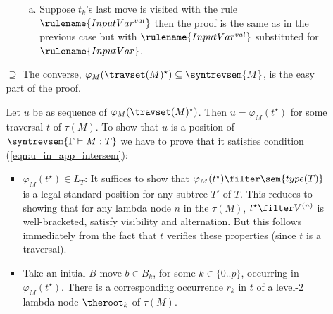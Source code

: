 \begin{itemize}[$\bullet$]
\begin{enumerate}
\begin{itemize}
\begin{enumerate}[(a)]
    \item Suppose $t_k$'s last move is visited with the rule $\rulename{InputVar^{val}}$ then the proof is the same as in the previous case but with $\rulename{InputVar^{val}}$ substituted for $\rulename{InputVar}$.
    \end{enumerate}

    \end{itemize}

\item[$\supseteq$]
  The converse, $\varphi_{M}( \travset(M)^\star) \subseteq \syntrevsem{M}$, is the easy part of the proof.

  Let $u$ be as sequence of $\varphi_{M}( \travset(M)^\star)$. Then
  $u = \varphi_{M}(t^\star)$ for some traversal $t$ of $\tau(M)$. To show that
  $u$ is a position of $\syntrevsem{\Gamma \vdash M : T}$ we have to prove that it satisfies condition (\ref{eqn:u_in_app_intersem}):
\begin{itemize}
    \item $\varphi_{M}(t^\star) \in L_T$: It suffices to show that $\varphi_{M}(t^\star) \filter \sem{type(T)}$ is a legal
    standard position for any subtree $T'$ of $T$. This reduces to showing that for any lambda node $n$ in the $\tau(M)$,
    $t^\star \filter V^{(n)}$ is well-bracketed, satisfy visibility and alternation. But this follows immediately from the fact that $t$ verifies these properties (since $t$ is a traversal).

    \item Take an initial $B$-move $b \in B_k$, for some $k\in\{0..p\}$, occurring in $\varphi_{M}(t^\star)$. There is a corresponding occurrence $r_k$ in $t$ of a level-$2$ lambda node $\theroot_k$ of $\tau(M)$.


\end{itemize}
\end{enumerate}
\end{itemize}
